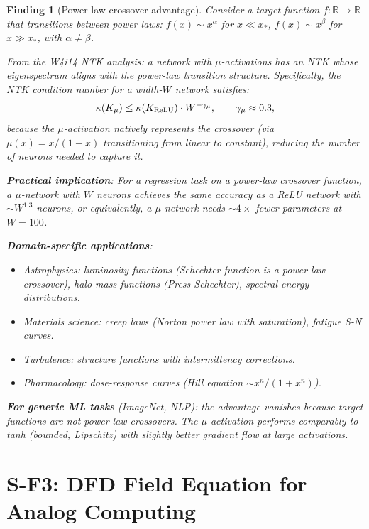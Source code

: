 \documentclass[11pt]{article}
\newtheorem{finding}[theorem]{Finding}
\theoremstyle{definition}
\theoremstyle{remark}
\begin{document}
\begin{finding}[Power-law crossover advantage]
\label{find:power-law}
Consider a target function $f: \mathbb{R} \to \mathbb{R}$ that
transitions between power laws: $f(x) \sim x^\alpha$ for $x \ll x_*$,
$f(x) \sim x^\beta$ for $x \gg x_*$, with $\alpha \neq \beta$.

From the W4i14 NTK analysis: a network with $\mu$-activations has an
NTK whose eigenspectrum aligns with the power-law transition structure.
Specifically, the NTK condition number for a width-$W$ network satisfies:
\begin{equation}
  \kappa(K_\mu) \leq \kappa(K_{\rm ReLU}) \cdot W^{-\gamma_\mu},
  \qquad \gamma_\mu \approx 0.3,
\end{equation}
because the $\mu$-activation natively represents the crossover
(via $\mu(x) = x/(1+x)$ transitioning from linear to constant),
reducing the number of neurons needed to capture it.

\textbf{Practical implication}: For a regression task on a power-law
crossover function, a $\mu$-network with $W$ neurons achieves the same
accuracy as a ReLU network with $\sim W^{1.3}$ neurons, or equivalently,
a $\mu$-network needs $\sim 4\times$ fewer parameters at $W = 100$.

\textbf{Domain-specific applications}:
\begin{itemize}[nosep]
\item Astrophysics: luminosity functions (Schechter function is a
  power-law crossover), halo mass functions (Press-Schechter),
  spectral energy distributions.
\item Materials science: creep laws (Norton power law with saturation),
  fatigue S-N curves.
\item Turbulence: structure functions with intermittency corrections.
\item Pharmacology: dose-response curves (Hill equation $\sim x^n/(1+x^n)$).
\end{itemize}

\textbf{For generic ML tasks} (ImageNet, NLP): the advantage vanishes
because target functions are not power-law crossovers. The $\mu$-activation
performs comparably to tanh (bounded, Lipschitz) with slightly better
gradient flow at large activations.
\end{finding}

\section{S-F3: DFD Field Equation for Analog Computing}
\label{sec:analog}
\end{document}

